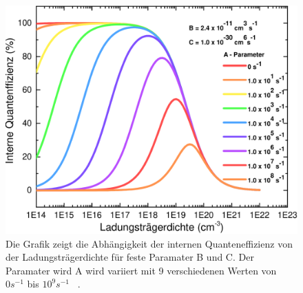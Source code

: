 \begin{figure}[tb]
    \centering
    \begin{minipage}[t]{0.49\linewidth}
        \centering
        \includegraphics[width=\linewidth]{Bilder/IQEohneDotierungVerschAParams.pdf}
        \caption{Die Grafik zeigt die Abhängigkeit der internen Quanteneffizienz von der Ladungsträgerdichte für feste Paramater B und C. Der Paramater wird A wird variiert mit 9 verschiedenen Werten von $0 s^{-1} $ bis $10^9 s^{-1}$ ~\cite{semreich}.}
        \label{fig:abha}
    \end{minipage}%
\end{figure}
\vspace{1cm}
\raggedright
\newpage
%

